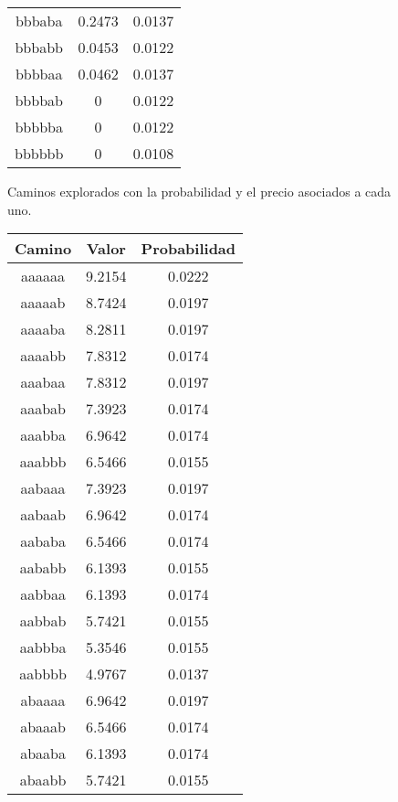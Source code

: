 \begin{figure}[hbpt]
\begin{minipage}{0.48\textwidth}
\begin{center}
\begin{tabular}{|c|c|c|}
bbbaba  &  0.2473  &  0.0137  \\
bbbabb  &  0.0453  &  0.0122  \\
bbbbaa  &  0.0462  &  0.0137  \\
bbbbab  & 0 &  0.0122  \\
bbbbba  & 0 &  0.0122  \\
bbbbbb  & 0 &  0.0108  \\
\hline
\end{tabular}
\end{center}
\end{minipage}
\caption{Caminos explorados con la probabilidad y el precio asociados a cada uno.}
\label{fig:2_3a}
\end{figure}

\begin{figure}[hbpt]
\begin{minipage}{0.48\textwidth}
\begin{center}
\begin{tabular}{|c|c|c|}
\hline
\textbf{Camino} & \textbf{Valor} & \textbf{Probabilidad} \\
\hline
aaaaaa  &  9.2154  &  0.0222  \\
aaaaab  &  8.7424  &  0.0197  \\
aaaaba  &  8.2811  &  0.0197  \\
aaaabb  &  7.8312  &  0.0174  \\
aaabaa  &  7.8312  &  0.0197  \\
aaabab  &  7.3923  &  0.0174  \\
aaabba  &  6.9642  &  0.0174  \\
aaabbb  &  6.5466  &  0.0155  \\
aabaaa  &  7.3923  &  0.0197  \\
aabaab  &  6.9642  &  0.0174  \\
aababa  &  6.5466  &  0.0174  \\
aababb  &  6.1393  &  0.0155  \\
aabbaa  &  6.1393  &  0.0174  \\
aabbab  &  5.7421  &  0.0155  \\
aabbba  &  5.3546  &  0.0155  \\
aabbbb  &  4.9767  &  0.0137  \\
abaaaa  &  6.9642  &  0.0197  \\
abaaab  &  6.5466  &  0.0174  \\
abaaba  &  6.1393  &  0.0174  \\
abaabb  &  5.7421  &  0.0155  \\

\end{tabular}
\end{center}
\end{minipage}
\end{figure}
